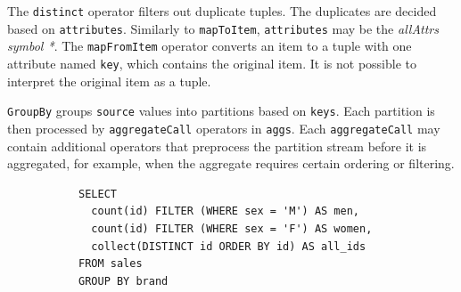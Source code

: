 The \texttt{distinct} operator filters out duplicate tuples. The duplicates are decided based on \texttt{attributes}. Similarly to \texttt{mapToItem}, \texttt{attributes} may be the \textit{allAttrs symbol *}. The \texttt{mapFromItem} operator converts an item to a tuple with one attribute named \texttt{key}, which contains the original item. It is not possible to interpret the original item as a tuple.

\texttt{GroupBy} groups \texttt{source} values into partitions based on \texttt{keys}. Each partition is then processed by \texttt{aggregateCall} operators in \texttt{aggs}. Each \texttt{aggregateCall} may contain additional operators that preprocess the partition stream before it is aggregated, for example, when the aggregate requires certain ordering or filtering.

\begin{figure}[htpb]
    \begin{subfigure}[b]{\textwidth}
    \begin{tcolorbox}[colback=white, colframe=black, boxrule=1pt, arc=0pt]
        \begin{verbatim}
SELECT
  count(id) FILTER (WHERE sex = 'M') AS men,
  count(id) FILTER (WHERE sex = 'F') AS women,
  collect(DISTINCT id ORDER BY id) AS all_ids
FROM sales
GROUP BY brand
        \end{verbatim}
    \end{tcolorbox}
    \end{subfigure}
    
    \medskip
    

\end{figure}
